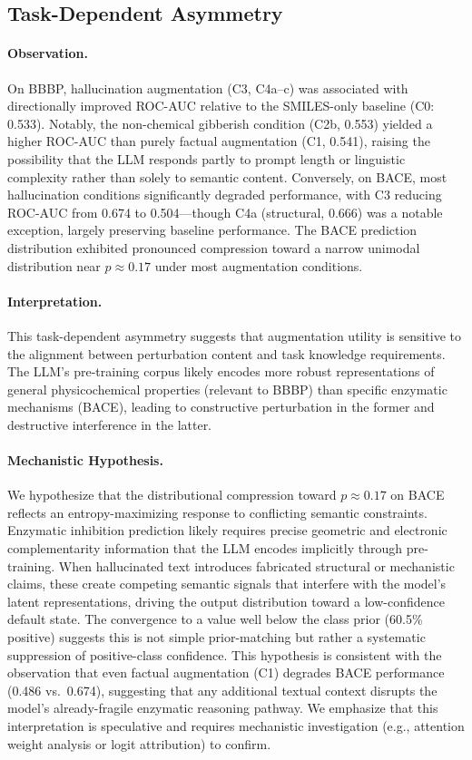 \subsection{Task-Dependent Asymmetry}
\paragraph{Observation.} On BBBP, hallucination augmentation (C3, C4a--c) was associated with directionally improved ROC-AUC relative to the SMILES-only baseline (C0: 0.533). Notably, the non-chemical gibberish condition (C2b, 0.553) yielded a higher ROC-AUC than purely factual augmentation (C1, 0.541), raising the possibility that the LLM responds partly to prompt length or linguistic complexity rather than solely to semantic content. Conversely, on BACE, most hallucination conditions significantly degraded performance, with C3 reducing ROC-AUC from 0.674 to 0.504---though C4a (structural, 0.666) was a notable exception, largely preserving baseline performance. The BACE prediction distribution exhibited pronounced compression toward a narrow unimodal distribution near $p \approx 0.17$ under most augmentation conditions.

\paragraph{Interpretation.} This task-dependent asymmetry suggests that augmentation utility is sensitive to the alignment between perturbation content and task knowledge requirements. The LLM's pre-training corpus likely encodes more robust representations of general physicochemical properties (relevant to BBBP) than specific enzymatic mechanisms (BACE), leading to constructive perturbation in the former and destructive interference in the latter.

\paragraph{Mechanistic Hypothesis.} We hypothesize that the distributional compression toward $p \approx 0.17$ on BACE reflects an entropy-maximizing response to conflicting semantic constraints. Enzymatic inhibition prediction likely requires precise geometric and electronic complementarity information that the LLM encodes implicitly through pre-training. When hallucinated text introduces fabricated structural or mechanistic claims, these create competing semantic signals that interfere with the model's latent representations, driving the output distribution toward a low-confidence default state. The convergence to a value well below the class prior (60.5\% positive) suggests this is not simple prior-matching but rather a systematic suppression of positive-class confidence. This hypothesis is consistent with the observation that even factual augmentation (C1) degrades BACE performance (0.486 vs.\ 0.674), suggesting that any additional textual context disrupts the model's already-fragile enzymatic reasoning pathway. We emphasize that this interpretation is speculative and requires mechanistic investigation (e.g., attention weight analysis or logit attribution) to confirm.

